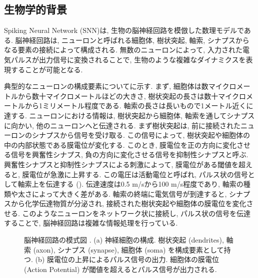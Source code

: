 \subsection{生物学的背景}
Spiking Neural Network (SNN)は, 生物の脳神経回路を模倣した数理モデルである.
脳神経回路は, ニューロンと呼ばれる細胞体, 樹状突起, 軸索, シナプスからなる要素の接続によって構成される\cite{braincomputing}.
無数のニューロンによって, 入力された電気パルスが出力信号に変換されることで, 生物のような複雑なダイナミクスを表現することが可能となる.

典型的なニューロンの構成要素についてに示す.
まず, 細胞体は数マイクロメートルから数十マイクロメートルほどの大きさ, 樹状突起の長さは数十マイクロメートルから1ミリメートル程度である.
軸索の長さは長いもので1メートル近くに達する.
ニューロンにおける情報は, 樹状突起から細胞体, 軸索を通してシナプスに向かい, 他のニューロンへと伝達される.
まず樹状突起は, 前に接続されたニューロンのシナプスから信号を受け取る.
この信号によって, 樹状突起や細胞体の中の内部状態である膜電位が変化する.
このとき, 膜電位を正の方向に変化させる信号を興奮性シナプス, 負の方向に変化させる信号を抑制性シナプスと呼ぶ.
興奮性シナプスと抑制性シナプスによる刺激によって, 膜電位がある閾値を超えると, 膜電位が急激に上昇する.
この電圧は活動電位と呼ばれ, パルス状の信号として軸索上を伝達する ().
伝達速度は0.5 m/sから100 m/s程度であり, 軸索の種類や太さによって大きく差がある.
軸索の終端に電気信号が到達すると, シナプスから化学伝達物質が分泌され, 接続された樹状突起や細胞体の膜電位を変化させる.
このようなニューロンをネットワーク状に接続し, パルス状の信号を伝達することで, 脳神経回路は複雑な情報処理を行っている.

\begin{figure}[htb]
    \centering

    \begin{minipage}{0.497\textwidth}
        \centering
        
        \label{fig:brain:neuron}
    \end{minipage}
    \hspace{0.02\textwidth}
    \begin{minipage}{0.3474\textwidth}
        \centering
        
        \label{fig:brain:actionpotential}
    \end{minipage}

    \caption[脳神経回路の模式図]{
        脳神経回路の模式図 \cite{lobo2020spiking}.
        (a) 神経細胞の構成. 
        樹状突起 (dendrites), 軸索 (axon), シナプス (synapse), 細胞体 (soma) を構成要素として持つ.
        (b) 膜電位の上昇によるパルス信号の出力.
        細胞体の膜電位 (Action Potential) が閾値を超えるとパルス信号が出力される.
    }
\end{figure}